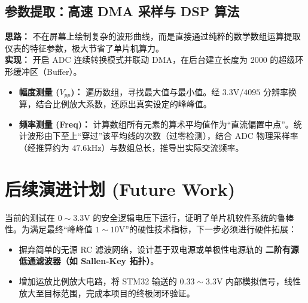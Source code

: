 \documentclass[a4paper,11pt]{ctexart}
\begin{document}
\subsection{参数提取：高速 DMA 采样与 DSP 算法}
\textbf{思路：} 不在屏幕上绘制复杂的波形曲线，而是直接通过纯粹的数学数组运算提取仪表的特征参数，极大节省了单片机算力。\\
\textbf{实现：}
开启 ADC 连续转换模式并联动 DMA，在后台建立长度为 2000 的超级环形缓冲区（Buffer）。
\begin{itemize}
    \item \textbf{幅度测量 ($V_{pp}$)：} 遍历数组，寻找最大值与最小值。经 $3.3\text{V} / 4095$ 分辨率换算，结合比例放大系数，还原出真实设定的峰峰值。
    \item \textbf{频率测量 (Freq)：} 计算数组所有元素的算术平均值作为“直流偏置中点”。统计波形由下至上“穿过”该平均线的次数（过零检测），结合 ADC 物理采样率（经推算约为 $47.6\text{kHz}$）与数组总长，推导出实际交流频率。
\end{itemize}

\section{后续演进计划 (Future Work)}

当前的测试在 $0 \sim 3.3\text{V}$ 的安全逻辑电压下运行，证明了单片机软件系统的鲁棒性。为满足最终“峰峰值 $1 \sim 10\text{V}$”的硬性技术指标，下一步必须进行硬件拓展：
\begin{itemize}
    \item 摒弃简单的无源 RC 滤波网络，设计基于双电源或单极性电源轨的 \textbf{二阶有源低通滤波器（如 Sallen-Key 拓扑）}。
    \item 增加运放比例放大电路，将 STM32 输送的 $0.33 \sim 3.3\text{V}$ 内部模拟信号，线性放大至目标范围，完成本项目的终极闭环验证。
\end{itemize}
\end{document}
